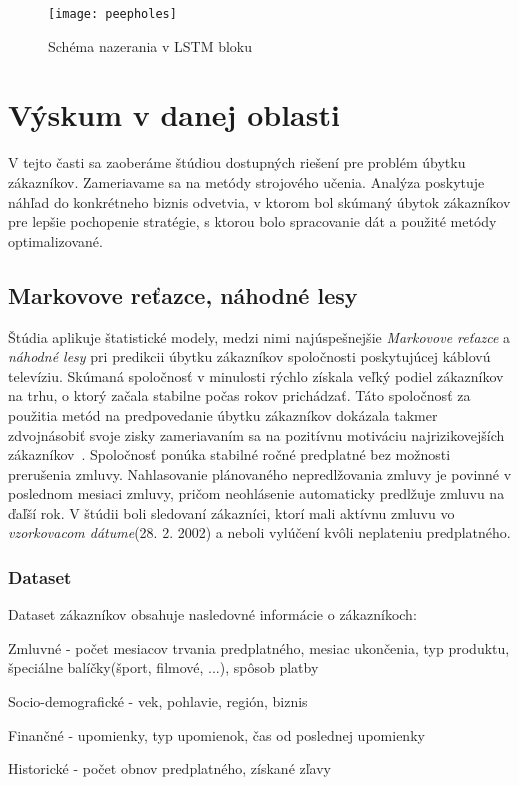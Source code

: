 \begin{figure}[H]
\begin{center}
\texttt{[image: peepholes]}\end{center}
\caption[peepholes]{Schéma nazerania v LSTM bloku~\cite{gers2003learning}}
\label{fig:peepholes}
\end{figure}

\section{Výskum v danej oblasti}
\label{analyza_vyskum_danej_oblasti}

V tejto časti sa zaoberáme štúdiou dostupných riešení pre problém úbytku zákazníkov. Zameriavame sa na metódy strojového učenia. Analýza poskytuje náhľad do konkrétneho biznis odvetvia, v ktorom bol skúmaný úbytok zákazníkov pre lepšie pochopenie stratégie, s ktorou bolo spracovanie dát a použité metódy optimalizované.

\subsection{Markovove reťazce, náhodné lesy}

Štúdia aplikuje štatistické modely, medzi nimi najúspešnejšie \textit{Markovove reťazce} a \textit{náhodné lesy} pri predikcii úbytku zákazníkov spoločnosti poskytujúcej káblovú televíziu. Skúmaná spoločnosť v minulosti rýchlo získala veľký podiel zákazníkov na trhu, o ktorý začala stabilne počas rokov prichádzať. Táto spoločnosť za použitia metód na predpovedanie úbytku zákazníkov dokázala takmer zdvojnásobiť svoje zisky zameriavaním sa na pozitívnu motiváciu najrizikovejších zákazníkov~\cite{burez2007crm}. 
\newline
Spoločnosť ponúka stabilné ročné predplatné bez možnosti prerušenia zmluvy. Nahlasovanie plánovaného nepredlžovania zmluvy je povinné v poslednom mesiaci zmluvy, pričom neohlásenie automaticky predlžuje zmluvu na ďaľší rok. V štúdii boli sledovaní zákazníci, ktorí mali aktívnu zmluvu vo \textit{vzorkovacom dátume}(28. 2. 2002) a neboli vylúčení kvôli neplateniu predplatného. 
\newline
\subsubsection{Dataset}
\label{markov_dataset}
Dataset zákazníkov obsahuje nasledovné informácie o zákazníkoch:

\begin{my_itemize}
	\item{Zmluvné} - počet mesiacov trvania predplatného, mesiac ukončenia, typ produktu, špeciálne balíčky(šport, filmové, ...), spôsob platby
	\item{Socio-demografické} - vek, pohlavie, región, biznis
	\item{Finančné} - upomienky, typ upomienok, čas od poslednej upomienky
	\item{Historické} - počet obnov predplatného, získané zľavy 
\end{my_itemize}


